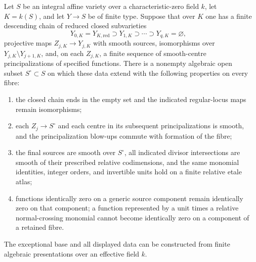 \begin{lemma}\label{lem:spread}
Let $S$ be an integral affine variety over a characteristic-zero field
$k$, let $K=k(S)$, and let $Y\to S$ be of finite type. Suppose that over
$K$ one has a finite descending chain of reduced closed subvarieties
\[
 Y_{0,K}=Y_{K,\mathrm{red}}\supset Y_{1,K}\supset\cdots
 \supset Y_{q,K}=\varnothing,
\]
projective maps $Z_{j,K}\to Y_{j,K}$ with smooth sources, isomorphisms
over $Y_{j,K}\setminus Y_{j+1,K}$, and, on each $Z_{j,K}$, a finite
sequence of smooth-centre principalizations of specified functions.
There is a nonempty algebraic open subset $S^\circ\subset S$ on which
these data extend with the following properties on every fibre:
\begin{enumerate}
\item the closed chain ends in the empty set and the indicated
regular-locus maps remain isomorphisms;
\item each $Z_j\to S^\circ$ and each centre in its subsequent
principalizations is smooth, and the principalization blow-ups commute
with formation of the fibre;
\item the final sources are smooth over $S^\circ$, all indicated divisor
intersections are smooth of their prescribed relative codimensions,
and the same monomial identities, integer orders, and invertible units
hold on a finite relative etale atlas;
\item functions identically zero on a generic source component remain
identically zero on that component; a function represented by a unit
times a relative normal-crossing monomial cannot become identically
zero on a component of a retained fibre.
\end{enumerate}
The exceptional base and all displayed data can be constructed from
finite algebraic presentations over an effective field $k$.
\end{lemma}
